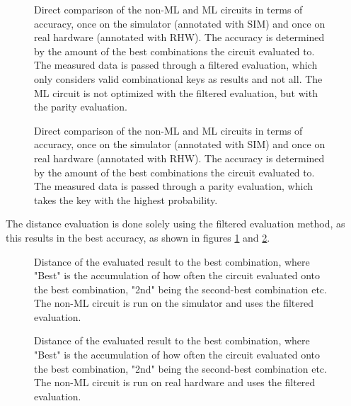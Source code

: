 \begin{figure}[!h]
    \centering
    \scalebox{\resultboxplot}{
        
    }
    \caption{Direct comparison of the non-ML and ML circuits in terms of accuracy, once on the simulator (annotated with SIM) and once on real hardware (annotated with RHW). The accuracy is determined by the amount of the best combinations the circuit evaluated to. The measured data is passed through a filtered evaluation, which only considers valid combinational keys as results and not all. The ML circuit is not optimized with the filtered evaluation, but with the parity evaluation.}
    \label{figure:comparison_ml_noml_filtered_acc}
\end{figure}

\newpage

\begin{figure}[!h]
    \centering
    \scalebox{\resultboxplot}{
        
    }
    \caption{Direct comparison of the non-ML and ML circuits in terms of accuracy, once on the simulator (annotated with SIM) and once on real hardware (annotated with RHW). The accuracy is determined by the amount of the best combinations the circuit evaluated to. The measured data is passed through a parity evaluation, which takes the key with the highest probability.}
    \label{figure:comparison_ml_noml_parity_acc}
\end{figure}

The distance evaluation is done solely using the filtered evaluation method, as this results in the best accuracy, as shown in figures \ref{figure:comparison_ml_noml_filtered_acc} and \ref{figure:comparison_ml_noml_parity_acc}.

\begin{figure}[!h]
    \centering
    \scalebox{\resultboxplot}{
        
    }
    \caption{Distance of the evaluated result to the best combination, where "Best" is the accumulation of how often the circuit evaluated onto the best combination, "2nd" being the second-best combination etc. The non-ML circuit is run on the simulator and uses the filtered evaluation.}
    \label{figure:noml_sim_distance}
\end{figure}

\begin{figure}[!h]
    \centering
    \scalebox{\resultboxplot}{
        
    }
    \caption{Distance of the evaluated result to the best combination, where "Best" is the accumulation of how often the circuit evaluated onto the best combination, "2nd" being the second-best combination etc. The non-ML circuit is run on real hardware and uses the filtered evaluation.}
    \label{figure:noml_rhw_dist}
\end{figure}

